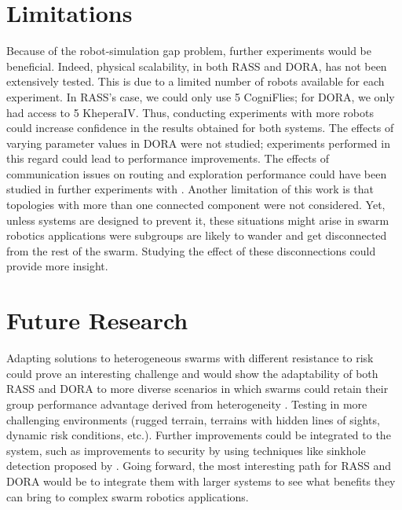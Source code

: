 \section{Limitations}\label{sec:Limitations}
Because of the robot-simulation gap problem, further experiments would be beneficial. Indeed, physical scalability, in both RASS and DORA, has not been extensively tested. This is due to a limited number of robots available for each experiment. In \ac{RASS}'s case, we could only use 5 CogniFlies; for \ac{DORA}, we only had access to 5 KheperaIV. Thus, conducting experiments with more robots could increase confidence in the results obtained for both systems. The effects of varying parameter values in \ac{DORA} were not studied; experiments performed in this regard could lead to performance improvements. The effects of communication issues on routing and exploration performance could have been studied in further experiments with \cite{selden2021botnet}. Another limitation of this work is that topologies with more than one connected component were not considered. Yet, unless systems are designed to prevent it, these situations might arise in swarm robotics applications were subgroups are likely to wander and get disconnected from the rest of the swarm. Studying the effect of these disconnections could provide more insight.

\section{Future Research}
Adapting solutions to heterogeneous swarms with different resistance to risk could prove an interesting challenge and would show the adaptability of both RASS and DORA to more diverse scenarios in which swarms could retain their group performance advantage derived from heterogeneity \cite{ferrante2015evolution}. Testing in more challenging environments (rugged terrain, terrains with hidden lines of sights, dynamic risk conditions, etc.). Further improvements could be integrated to the system, such as improvements to security by using techniques like sinkhole detection proposed by \cite{abdullah2015detecting}. Going forward, the most interesting path for \ac{RASS} and \ac{DORA} would be to integrate them with larger systems to see what benefits they can bring to complex swarm robotics applications.